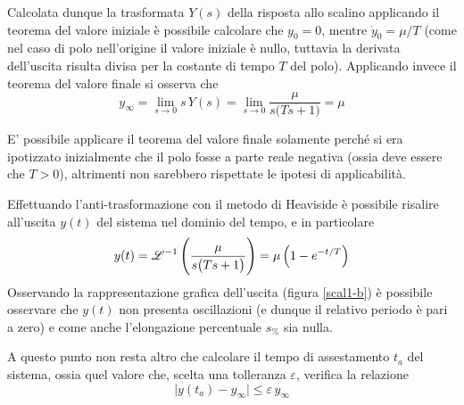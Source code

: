 			Calcolata dunque la trasformata $Y(s)$ della risposta allo scalino applicando il teorema del valore iniziale è possibile calcolare che $y_0=0$, mentre $\dot y_0 = \mu / T$ (come nel caso di polo nell'origine il valore iniziale è nullo, tuttavia la derivata dell'uscita risulta divisa per la costante di tempo $T$ del polo). Applicando invece il teorema del valore finale si osserva che
			\[ y_\infty = \lim_{s\rightarrow 0} s\,Y(s) = \lim_{s\rightarrow 0} \frac \mu{s\big(Ts + 1\big)} = \mu \]
			\begin{nota}
				E' possibile applicare il teorema del valore finale solamente perché si era ipotizzato inizialmente che il polo fosse a parte reale negativa (ossia deve essere che $T>0$), altrimenti non sarebbero rispettate le ipotesi di applicabilità.
			\end{nota}
			Effettuando l'anti-trasformazione con il metodo di Heaviside è possibile risalire all'uscita $y(t)$  del sistema nel dominio del tempo, e in particolare
			\[ y(t) = \mathscr {L}^{-1} \left( \frac \mu{s\big(Ts + 1\big)} \right) = \mu \left(1 - e^{-t/T}\right)\]
			Osservando la rappresentazione grafica dell'uscita (figura \ref{scal1-b}) è possibile osservare che $y(t)$ non presenta oscillazioni (e dunque il relativo periodo è pari a zero) e come anche l'elongazione percentuale $s_\%$ sia nulla.
			
			A questo punto non resta altro che calcolare il tempo di assestamento $t_a$ del sistema, ossia quel valore che, scelta una tolleranza $\varepsilon$, verifica la relazione
			\begin{equation} \label{eq:lti:tolleranza}
				\big|y(t_a) - y_\infty\big| \leq \varepsilon \, y_\infty
			\end{equation}
			
